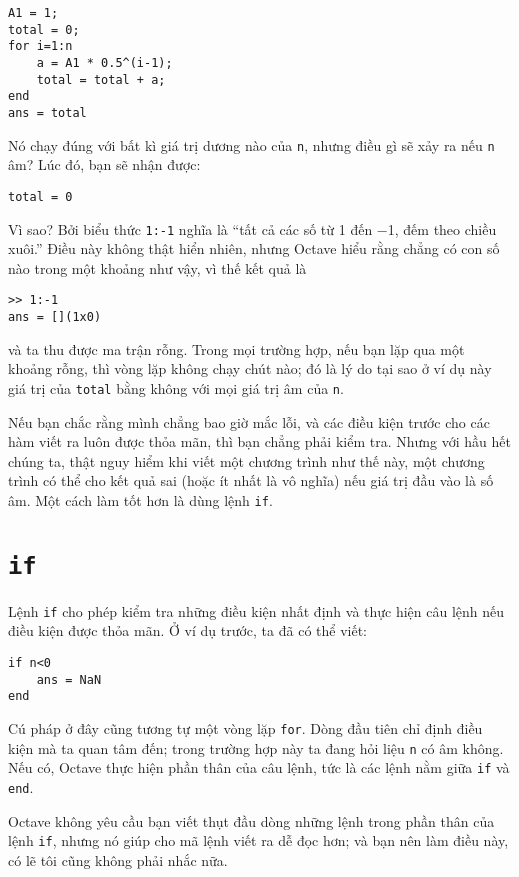 \documentclass[12pt]{book}
\begin{document}
\begin{verbatim}
A1 = 1;
total = 0;
for i=1:n
    a = A1 * 0.5^(i-1);
    total = total + a;
end
ans = total
\end{verbatim}
%
Nó chạy đúng với bất kì giá trị dương nào của {\tt n}, nhưng
điều gì sẽ xảy ra nếu {\tt n} âm? Lúc đó, bạn sẽ nhận được:

\begin{verbatim}
total = 0
\end{verbatim}
%
Vì sao? Bởi biểu thức {\tt 1:-1} nghĩa là ``tất cả các số từ
1 đến $-$1, đếm theo chiều xuôi.'' Điều này không thật hiển nhiên, 
nhưng Octave hiểu rằng chẳng có con số nào trong một
khoảng như vậy, vì thế kết quả là

\begin{verbatim}
>> 1:-1
ans = [](1x0)
\end{verbatim}
%
và ta thu được ma trận rỗng. Trong mọi trường hợp, nếu bạn lặp qua một
khoảng rỗng, thì vòng lặp không chạy chút nào; đó là lý do 
tại sao ở ví dụ này giá trị của {\tt total} bằng không với mọi
giá trị âm của {\tt n}.

Nếu bạn chắc rằng mình chẳng bao giờ mắc lỗi, và các 
điều kiện trước cho các hàm viết ra luôn được thỏa mãn, thì bạn
chẳng phải kiểm tra. Nhưng với hầu hết chúng ta, thật nguy hiểm
khi viết một chương trình như thế này, một chương trình có thể
cho kết quả sai (hoặc ít nhất là vô nghĩa) nếu giá trị đầu vào
là số âm. Một cách làm tốt hơn là dùng lệnh {\tt if}.


\section{{\tt if}}

Lệnh {\tt if} cho phép kiểm tra những điều kiện nhất định và
thực hiện câu lệnh nếu điều kiện được thỏa mãn. Ở ví dụ trước,
ta đã có thể viết:

\begin{verbatim}
if n<0
    ans = NaN
end
\end{verbatim}
%
Cú pháp ở đây cũng tương tự một vòng lặp {\tt for}. Dòng đầu tiên
chỉ định điều kiện mà ta quan tâm đến; trong trường hợp này
ta đang hỏi liệu {\tt n} có âm không.  Nếu có, Octave thực hiện
phần thân của câu lệnh, tức là các lệnh nằm giữa 
{\tt if} và {\tt end}.

Octave không yêu cầu bạn viết thụt đầu dòng những lệnh trong
phần thân của lệnh {\tt if}, nhưng nó giúp cho mã lệnh viết ra 
dễ đọc hơn; và bạn nên làm điều này, có lẽ tôi cũng không phải
nhắc nữa.
\end{document}
